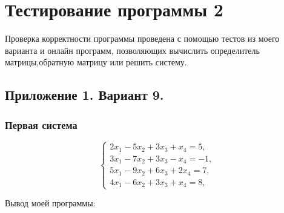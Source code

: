 \documentclass[a4paper,12pt,titlepage,finall]{article}
\begin{document}
\section{Тестирование программы 2}
Проверка корректности программы проведена с помощью тестов из моего варианта и онлайн программ, позволяющих вычислить определитель матрицы,обратную матрицу или решить систему.

\subsection{Приложение 1. Вариант 9.}
\subsubsection{Первая система}

\begin{equation*}
 \begin{cases}
   2x_1 - 5x_2 + 3x_3 + x_4 = 5, 
   \\
   3x_1 - 7x_2 + 3x_3 - x_4 = -1,
   \\
   5x_1 - 9x_2 + 6x_3 + 2x_4 = 7,
   \\
   4x_1 - 6x_2 + 3x_3 + x_4 = 8,
 \end{cases}
\end{equation*}

Вывод моей программы:
\end{document}
